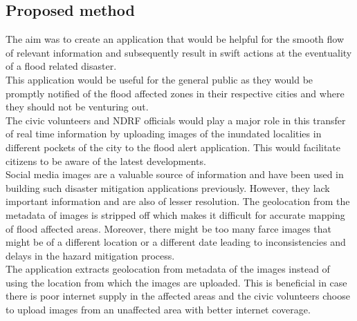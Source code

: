 \documentclass{IEEEtran}
\begin{document}
\subsection{Proposed method}
The aim was to create an application that would be helpful for the smooth flow of relevant information and subsequently result in swift actions at the eventuality of a flood related disaster.\\
This application would be useful for the general public as they would be promptly notified of the flood affected zones in their respective cities and where they should not be venturing out. \\
The civic volunteers and NDRF officials would play a major role in this transfer of real time information by uploading images of the inundated localities in different pockets of the city to the flood alert application. This would facilitate citizens to be aware of the latest developments.\\
Social media images are a valuable source of information and have been used in building such disaster mitigation applications previously. However, they lack important information and are also of lesser resolution. The geolocation from the metadata of images is stripped off which makes it difficult for accurate mapping of flood affected areas. Moreover, there might be too many farce images that might be of a different location or a different date leading to inconsistencies and  delays in the hazard mitigation process.\\
The application extracts geolocation from metadata of the images instead of using the location from which the images are uploaded. This is beneficial in case there is poor internet supply in the affected areas and the civic volunteers choose to upload images from an unaffected area with better internet coverage.
\end{document}
